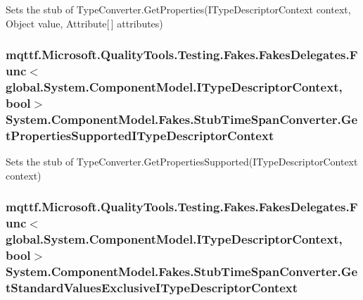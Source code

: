Sets the stub of Type\-Converter.\-Get\-Properties(\-I\-Type\-Descriptor\-Context context, Object value, Attribute\mbox{[}$\,$\mbox{]} attributes)

\hypertarget{class_system_1_1_component_model_1_1_fakes_1_1_stub_time_span_converter_a14d5012e7d1e08d5e6cc42acdd0d65f5}{
\subsubsection[{Get\-Properties\-Supported\-I\-Type\-Descriptor\-Context}]{\setlength{\rightskip}{0pt plus 5cm}mqttf.\-Microsoft.\-Quality\-Tools.\-Testing.\-Fakes.\-Fakes\-Delegates.\-Func$<$global.\-System.\-Component\-Model.\-I\-Type\-Descriptor\-Context, bool$>$ System.\-Component\-Model.\-Fakes.\-Stub\-Time\-Span\-Converter.\-Get\-Properties\-Supported\-I\-Type\-Descriptor\-Context}}\label{class_system_1_1_component_model_1_1_fakes_1_1_stub_time_span_converter_a14d5012e7d1e08d5e6cc42acdd0d65f5}


Sets the stub of Type\-Converter.\-Get\-Properties\-Supported(\-I\-Type\-Descriptor\-Context context)

\hypertarget{class_system_1_1_component_model_1_1_fakes_1_1_stub_time_span_converter_a7f995ca5977ba8f05043d89d7f776381}{
\subsubsection[{Get\-Standard\-Values\-Exclusive\-I\-Type\-Descriptor\-Context}]{\setlength{\rightskip}{0pt plus 5cm}mqttf.\-Microsoft.\-Quality\-Tools.\-Testing.\-Fakes.\-Fakes\-Delegates.\-Func$<$global.\-System.\-Component\-Model.\-I\-Type\-Descriptor\-Context, bool$>$ System.\-Component\-Model.\-Fakes.\-Stub\-Time\-Span\-Converter.\-Get\-Standard\-Values\-Exclusive\-I\-Type\-Descriptor\-Context}}\label{class_system_1_1_component_model_1_1_fakes_1_1_stub_time_span_converter_a7f995ca5977ba8f05043d89d7f776381}



